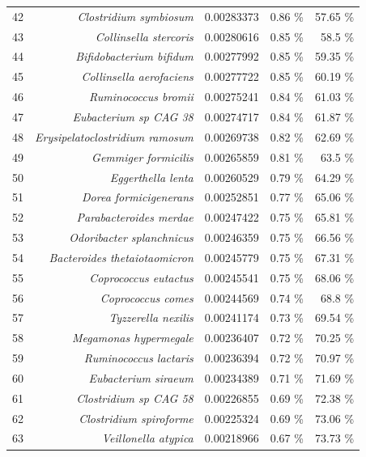 \documentclass{article}
\begin{document}
\begin{table}
\begin{tabular}{|r|r|r|r|r|}
      42 & \textit{Clostridium symbiosum} & 0.00283373 & 0.86 \% & 57.65 \% \\
      43 & \textit{Collinsella stercoris} & 0.00280616 & 0.85 \% & 58.5 \% \\
      44 & \textit{Bifidobacterium bifidum} & 0.00277992 & 0.85 \% & 59.35 \% \\
      45 & \textit{Collinsella aerofaciens} & 0.00277722 & 0.85 \% & 60.19 \% \\
      46 & \textit{Ruminococcus bromii} & 0.00275241 & 0.84 \% & 61.03 \% \\
      47 & \textit{Eubacterium sp CAG 38} & 0.00274717 & 0.84 \% & 61.87 \% \\
      48 & \textit{Erysipelatoclostridium ramosum} & 0.00269738 & 0.82 \% & 62.69 \% \\
      49 & \textit{Gemmiger formicilis} & 0.00265859 & 0.81 \% & 63.5 \% \\
      50 & \textit{Eggerthella lenta} & 0.00260529 & 0.79 \% & 64.29 \% \\
      51 & \textit{Dorea formicigenerans} & 0.00252851 & 0.77 \% & 65.06 \% \\
      52 & \textit{Parabacteroides merdae} & 0.00247422 & 0.75 \% & 65.81 \% \\
      53 & \textit{Odoribacter splanchnicus} & 0.00246359 & 0.75 \% & 66.56 \% \\
      54 & \textit{Bacteroides thetaiotaomicron} & 0.00245779 & 0.75 \% & 67.31 \% \\
      55 & \textit{Coprococcus eutactus} & 0.00245541 & 0.75 \% & 68.06 \% \\
      56 & \textit{Coprococcus comes} & 0.00244569 & 0.74 \% & 68.8 \% \\
      57 & \textit{Tyzzerella nexilis} & 0.00241174 & 0.73 \% & 69.54 \% \\
      58 & \textit{Megamonas hypermegale} & 0.00236407 & 0.72 \% & 70.25 \% \\
      59 & \textit{Ruminococcus lactaris} & 0.00236394 & 0.72 \% & 70.97 \% \\
      60 & \textit{Eubacterium siraeum} & 0.00234389 & 0.71 \% & 71.69 \% \\
      61 & \textit{Clostridium sp CAG 58} & 0.00226855 & 0.69 \% & 72.38 \% \\
      62 & \textit{Clostridium spiroforme} & 0.00225324 & 0.69 \% & 73.06 \% \\
      63 & \textit{Veillonella atypica} & 0.00218966 & 0.67 \% & 73.73 \% \\

\end{tabular}
\end{table}
\end{document}
